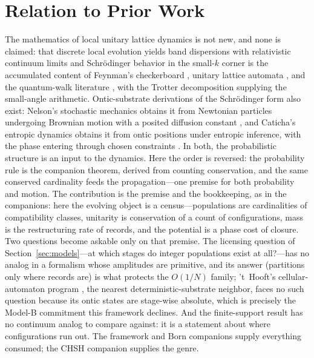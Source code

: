 \documentclass[11pt]{article}
\theoremstyle{definition}
\theoremstyle{remark}
\begin{document}
\section{Relation to Prior Work}\label{sec:prior}
The mathematics of local unitary lattice dynamics is not new, and none is claimed: that discrete local evolution yields band dispersions with relativistic continuum limits and Schr\"odinger behavior in the small-$k$ corner is the accumulated content of Feynman's checkerboard \cite{FeynmanHibbs1965}, unitary lattice automata \cite{BB1994,Meyer1996}, and the quantum-walk literature \cite{Kempe2003}, with the Trotter decomposition \cite{Trotter1959} supplying the small-angle arithmetic. Ontic-substrate derivations of the Schr\"odinger form also exist: Nelson's stochastic mechanics obtains it from Newtonian particles undergoing Brownian motion with a posited diffusion constant \cite{Nelson1966}, and Caticha's entropic dynamics obtains it from ontic positions under entropic inference, with the phase entering through chosen constraints \cite{Caticha2011}. In both, the probabilistic structure is an input to the dynamics. Here the order is reversed: the probability rule is the companion theorem, derived from counting conservation, and the same conserved cardinality feeds the propagation---one premise for both probability and motion. The contribution is the premise and the bookkeeping, as in the companions: here the evolving object is a census---populations are cardinalities of compatibility classes, unitarity is conservation of a count of configurations, mass is the restructuring rate of records, and the potential is a phase cost of closure. Two questions become askable only on that premise. The licensing question of Section~\ref{sec:models}---at which stages do integer populations exist at all?---has no analog in a formalism whose amplitudes are primitive, and its answer (partitions only where records are) is what protects the $O(1/N)$ family; 't~Hooft's cellular-automaton program \cite{tHooft2016}, the nearest deterministic-substrate neighbor, faces no such question because its ontic states are stage-wise absolute, which is precisely the Model-B commitment this framework declines. And the finite-support result has no continuum analog to compare against: it is a statement about where configurations run out. The framework and Born companions \cite{TillittCR,TillittBorn} supply everything consumed; the CHSH companion \cite{TillittCHSH} supplies the genre.
\end{document}
